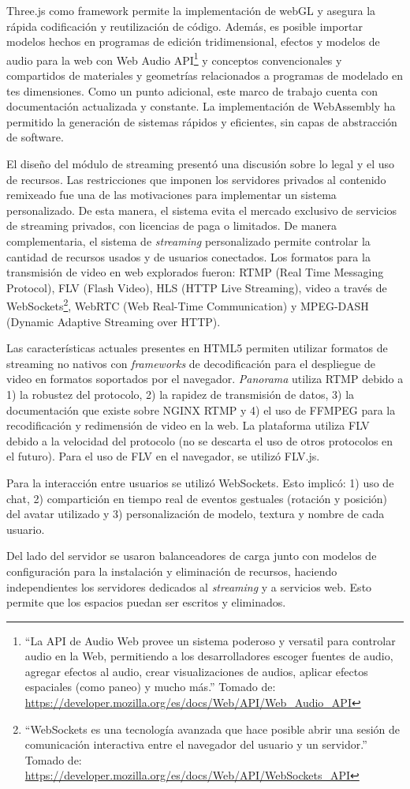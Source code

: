 Three.js como framework permite la implementación de webGL y asegura la rápida codificación y reutilización de código. Además, es posible importar modelos hechos en programas de edición tridimensional, efectos y modelos de audio para la web con Web Audio API\footnote{``La API de Audio Web provee un sistema poderoso y versatil para controlar audio en la Web, permitiendo a los desarrolladores escoger fuentes de audio, agregar efectos al audio, crear visualizaciones de audios, aplicar efectos espaciales (como paneo) y mucho más.'' Tomado de: \url{https://developer.mozilla.org/es/docs/Web/API/Web_Audio_API}} y conceptos convencionales y compartidos de materiales y geometrías relacionados a programas de modelado en tes dimensiones. Como un punto adicional, este marco de trabajo cuenta con documentación actualizada y constante. La implementación de WebAssembly ha permitido la generación de sistemas rápidos y eficientes, sin capas de abstracción de software.

El diseño del módulo de streaming presentó una discusión sobre lo legal y el uso de recursos. Las restricciones que imponen los servidores privados al contenido remixeado fue una de las motivaciones para implementar un sistema personalizado. De esta manera, el sistema evita el mercado exclusivo de servicios de streaming privados, con licencias de paga o limitados. De manera complementaria, el sistema de \textit{streaming} personalizado permite controlar la cantidad de recursos usados y  de usuarios conectados. Los formatos para la transmisión de video en web explorados fueron: RTMP (Real Time Messaging Protocol), FLV (Flash Video), HLS (HTTP Live Streaming), video a través de WebSockets\footnote{``WebSockets es una tecnología avanzada que hace posible abrir una sesión de comunicación interactiva entre el navegador del usuario y un servidor.'' Tomado de: \url{https://developer.mozilla.org/es/docs/Web/API/WebSockets_API}}, WebRTC (Web Real-Time Communication) y MPEG-DASH (Dynamic Adaptive Streaming over HTTP).

Las características actuales presentes en HTML5 permiten utilizar formatos de streaming no nativos con \textit{frameworks} de decodificación para el despliegue de video en formatos soportados por el navegador. \textit{Panorama} utiliza RTMP debido a 1) la robustez del protocolo, 2) la rapidez de transmisión de datos, 3) la documentación que existe sobre NGINX RTMP y 4) el uso de FFMPEG para la recodificación y redimensión de video en la web. La plataforma utiliza FLV debido a la velocidad del protocolo (no se descarta el uso de otros protocolos en el futuro). Para el uso de FLV en el navegador, se utilizó FLV.js. 

Para la interacción entre usuarios se utilizó WebSockets. Esto implicó: 1) uso de chat, 2) compartición en tiempo real de eventos gestuales (rotación y posición) del avatar utilizado y 3) personalización de modelo, textura y nombre de cada usuario. 

Del lado del servidor  se usaron balanceadores de carga junto con modelos de configuración para la instalación y eliminación de recursos, haciendo independientes los servidores dedicados al \textit{streaming} y a servicios web. Esto permite que los espacios puedan ser escritos y eliminados.
